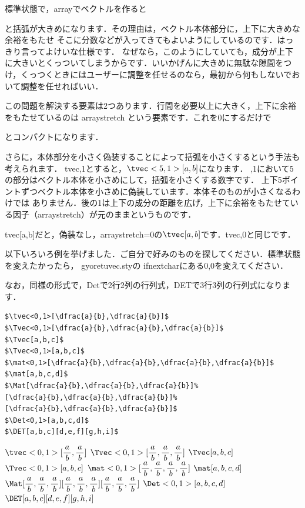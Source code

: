 \documentclass [10pt,fleqn,b5paper]{jsarticlek}
\begin{document}
標準状態で，arrayでベクトルを作ると{\fboxsep=0pt
と括弧が大きめになります．その理由は，ベクトル本体部分に，上下に大きめな余裕をもたせ
そこに分数などが入ってきてもよいようにしているのです．はっきり言ってよけいな仕様です．
なぜなら，このようにしていても，成分が上下に大きいとくっついてしまうからです．いいかげんに大きめに無駄な隙間をつけ，くっつくときにはユーザーに調整を任せるのなら，最初から何もしないでおいて調整を任せればいい．

この問題を解決する要素は2つあります．行間を必要以上に大きく，上下に余裕をもたせているのは
arraystretch
という要素です．これを0にするだけで{\fboxsep=0ptとコンパクトになります．

さらに，本体部分を小さく偽装することによって括弧を小さくするという手法も考えられます．
\yy tvec,1\fb [a,b]とすると，$\tvec<5,1>[a,b]$になります．
,1\fb において5の部分はベクトル本体を小さめにして，括弧を小さくする数字です．
上下5ポイントずつベクトル本体を小さめに偽装しています．本体そのものが小さくなるわけでは
ありません．後の1は上下の成分の距離を広げ，上下に余裕をもたせている因子（arraystretch）が元のままというものです．

 \yy tvec[a,b]だと，偽装なし，arraystretch=0の$\tvec[a,b]$です．\yy tvec,0\fb [a,b]と同じです．
 
 以下いろいろ例を挙げました．ご自分で好みのものを探してください．標準状態を変えたかったら，
gyoretuvec.styの ifnextcharにある0,0を変えてください．

なお，同様の形式で，\yy Detで2行2列の行列式，\yy DETで3行3列の行列式になります．
\\
\begin{Verbatim}
$\tvec<0,1>[\dfrac{a}{b},\dfrac{a}{b}]$
$\Tvec<0,1>[\dfrac{a}{b},\dfrac{a}{b},\dfrac{a}{b}]$
$\Tvec[a,b,c]$
$\Tvec<0,1>[a,b,c]$
$\mat<0,1>[\dfrac{a}{b},\dfrac{a}{b},\dfrac{a}{b},\dfrac{a}{b}]$
$\mat[a,b,c,d]$
$\Mat[\dfrac{a}{b},\dfrac{a}{b},\dfrac{a}{b}]%
[\dfrac{a}{b},\dfrac{a}{b},\dfrac{a}{b}]%
[\dfrac{a}{b},\dfrac{a}{b},\dfrac{a}{b}]$
$\Det<0,1>[a,b,c,d]$
$\DET[a,b,c][d,e,f][g,h,i]$
\end{Verbatim}
\aki
$\tvec<0,1>[\dfrac{a}{b},\dfrac{a}{b}]$
$\Tvec<0,1>[\dfrac{a}{b},\dfrac{a}{b},\dfrac{a}{b}]$
$\Tvec[a,b,c]$
$\Tvec<0,1>[a,b,c]$
$\mat<0,1>[\dfrac{a}{b},\dfrac{a}{b},\dfrac{a}{b},\dfrac{a}{b}]$
$\mat[a,b,c,d]$
$\Mat[\dfrac{a}{b},\dfrac{a}{b},\dfrac{a}{b}]%
[\dfrac{a}{b},\dfrac{a}{b},\dfrac{a}{b}]%
[\dfrac{a}{b},\dfrac{a}{b},\dfrac{a}{b}]$
$\Det<0,1>[a,b,c,d]$
$\DET[a,b,c][d,e,f][g,h,i]$

}}
\end{document}
